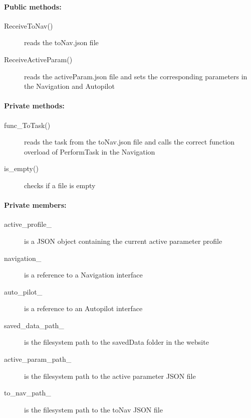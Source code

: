 \paragraph{Public methods:}
\begin{adjustwidth}{2.5em}{0pt}\begin{description}
		\item [ReceiveToNav()] reads the toNav.json file
		\item [ReceiveActiveParam()] reads the activeParam.json file and sets the corresponding parameters in the Navigation and Autopilot
\end{description}\end{adjustwidth}

\paragraph{Private methods:}
\begin{adjustwidth}{2.5em}{0pt}\begin{description}
		\item [func_ToTask()] reads the task from the toNav.json file and calls the correct function overload of PerformTask in the Navigation
		\item [is_empty()] checks if a file is empty
\end{description}\end{adjustwidth}

\paragraph{Private members:}
\begin{adjustwidth}{2.5em}{0pt}\begin{description}
		\item [active_profile_] is a JSON object containing the current active parameter profile
		\item [navigation_] is a reference to a Navigation interface
		\item [auto_pilot_] is a reference to an Autopilot interface
		\item [saved_data_path_] is the filesystem path to the savedData folder in the website
		\item [active_param_path_] is the filesystem path to the active parameter JSON file
		\item [to_nav_path_] is the filesystem path to the toNav JSON file
\end{description}\end{adjustwidth}

